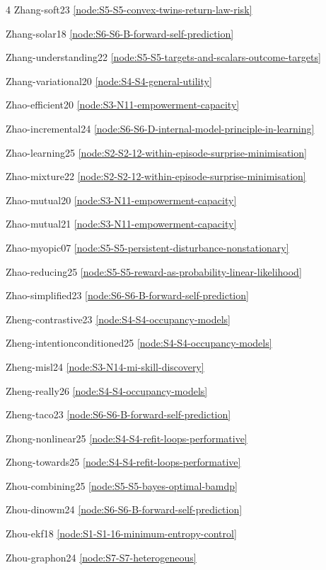 \documentclass[10pt]{article}
\begin{document}
{\begin{multicols}{4}
Zhang-soft23 \hfill \ref{node:S5-S5-convex-twins-return-law-risk}\par
Zhang-solar18 \hfill \ref{node:S6-S6-B-forward-self-prediction}\par
Zhang-understanding22 \hfill \ref{node:S5-S5-targets-and-scalars-outcome-targets}\par
Zhang-variational20 \hfill \ref{node:S4-S4-general-utility}\par
Zhao-efficient20 \hfill \ref{node:S3-N11-empowerment-capacity}\par
Zhao-incremental24 \hfill \ref{node:S6-S6-D-internal-model-principle-in-learning}\par
Zhao-learning25 \hfill \ref{node:S2-S2-12-within-episode-surprise-minimisation}\par
Zhao-mixture22 \hfill \ref{node:S2-S2-12-within-episode-surprise-minimisation}\par
Zhao-mutual20 \hfill \ref{node:S3-N11-empowerment-capacity}\par
Zhao-mutual21 \hfill \ref{node:S3-N11-empowerment-capacity}\par
Zhao-myopic07 \hfill \ref{node:S5-S5-persistent-disturbance-nonstationary}\par
Zhao-reducing25 \hfill \ref{node:S5-S5-reward-as-probability-linear-likelihood}\par
Zhao-simplified23 \hfill \ref{node:S6-S6-B-forward-self-prediction}\par
Zheng-contrastive23 \hfill \ref{node:S4-S4-occupancy-models}\par
Zheng-intentionconditioned25 \hfill \ref{node:S4-S4-occupancy-models}\par
Zheng-misl24 \hfill \ref{node:S3-N14-mi-skill-discovery}\par
Zheng-really26 \hfill \ref{node:S4-S4-occupancy-models}\par
Zheng-taco23 \hfill \ref{node:S6-S6-B-forward-self-prediction}\par
Zhong-nonlinear25 \hfill \ref{node:S4-S4-refit-loops-performative}\par
Zhong-towards25 \hfill \ref{node:S4-S4-refit-loops-performative}\par
Zhou-combining25 \hfill \ref{node:S5-S5-bayes-optimal-bamdp}\par
Zhou-dinowm24 \hfill \ref{node:S6-S6-B-forward-self-prediction}\par
Zhou-ekf18 \hfill \ref{node:S1-S1-16-minimum-entropy-control}\par
Zhou-graphon24 \hfill \ref{node:S7-S7-heterogeneous}\par

\end{multicols}}
\end{document}
